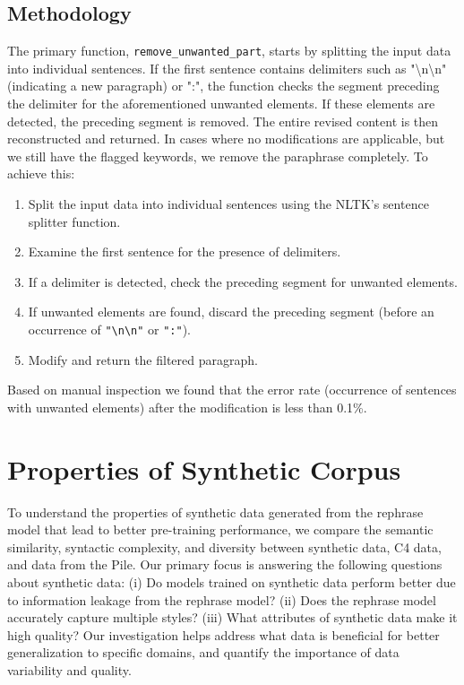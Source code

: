 \documentclass[table]{article}
\begin{document}
\subsection{Methodology}

The primary function, \texttt{remove\_unwanted\_part}, starts by splitting the input data into individual sentences. If the first sentence contains delimiters such as "\textbackslash n\textbackslash n" (indicating a new paragraph) or ":", the function checks the segment preceding the delimiter for the aforementioned unwanted elements. If these elements are detected, the preceding segment is removed. The entire revised content is then reconstructed and returned. In cases where no modifications are applicable, but we still have the flagged keywords, we remove the paraphrase completely. To achieve this: 

\begin{enumerate}
    \item Split the input data into individual sentences using the NLTK's sentence splitter function.
    \item Examine the first sentence for the presence of delimiters.
    \item If a delimiter is detected, check the preceding segment for unwanted elements.
    \item If unwanted elements are found, discard the preceding segment (before an occurrence of \texttt{"\textbackslash n\textbackslash n"} or \texttt{":"}).
    \item Modify and return the filtered paragraph.
\end{enumerate}

Based on manual inspection we found that the error rate (occurrence of sentences with unwanted elements) after the modification is less than 0.1\%. 

\section{Properties of Synthetic Corpus}
\label{sec:synth_properties}
To understand the properties of synthetic data generated from the rephrase model that lead to better pre-training performance, we compare the semantic similarity, syntactic complexity, and diversity between synthetic data, C4 data, and data from the Pile.  Our primary focus is answering the following questions about synthetic data: (i) Do models trained on synthetic data perform better due to information leakage from the rephrase model? (ii) Does the rephrase model accurately capture multiple styles? (iii) What attributes of synthetic data make it high quality? Our investigation helps address what data is beneficial for better generalization to specific domains, and quantify the importance of data variability and quality.
\end{document}
